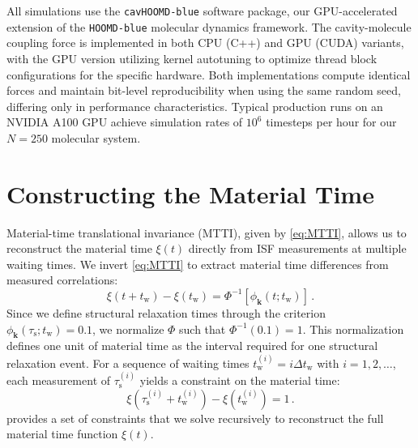 \documentclass[%
 reprint,
 amsmath,amssymb,
 aps,
]{revtex4-2}
\begin{document}
All simulations use the \texttt{cavHOOMD-blue} software package, our GPU-accelerated extension of the \texttt{HOOMD-blue} molecular dynamics framework.
The cavity-molecule coupling force is implemented in both CPU (C++) and GPU (CUDA) variants, with the GPU version utilizing kernel autotuning to optimize thread block configurations for the specific hardware.
Both implementations compute identical forces and maintain bit-level reproducibility when using the same random seed, differing only in performance characteristics.
Typical production runs on an NVIDIA A100 GPU achieve simulation rates of $10^6$ timesteps per hour for our $N=250$ molecular system.

\section{Constructing the Material Time}

Material-time translational invariance (MTTI), given by \cref{eq:MTTI}, allows us to reconstruct the material time $\xi(t)$ directly from ISF measurements at multiple waiting times. We invert \cref{eq:MTTI} to extract material time differences from measured correlations:
\begin{equation}
\xi(t+t_\mathrm{w})-\xi(t_\mathrm{w}) = \Phi^{-1}[\phi_{\bm{k}}(t; t_\mathrm{w})] \,.
\end{equation}
Since we define structural relaxation times through the criterion $\phi_{\bm{k}}(\tau_\mathrm{s}; t_\mathrm{w})=0.1$, we normalize $\Phi$ such that $\Phi^{-1}(0.1) = 1$. This normalization defines one unit of material time as the interval required for one structural relaxation event. For a sequence of waiting times $t_\mathrm{w}^{(i)} = i \Delta t_\mathrm{w}$ with $i=1,2,\ldots$, each measurement of $\tau_\mathrm{s}^{(i)}$ yields a constraint on the material time:
\begin{equation}
\xi\left(\tau_\mathrm{s}^{(i)}+t_\mathrm{w}^{(i)}\right)-\xi(t_\mathrm{w}^{(i)})=1 \,. \label{eq:xitime}
\end{equation}
 provides a set of constraints that we solve recursively to reconstruct the full material time function $\xi(t)$.
\end{document}
